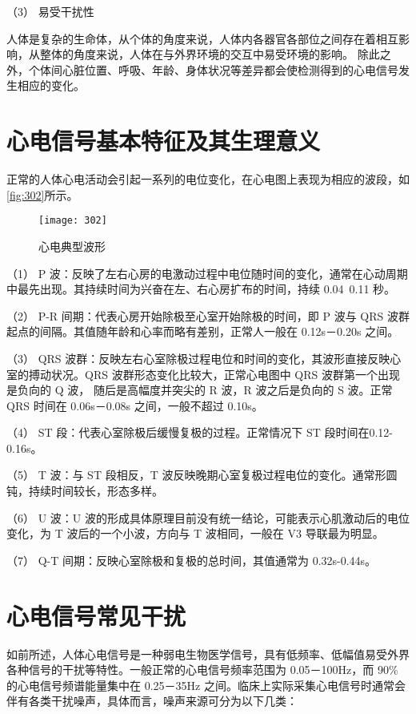 （3）	易受干扰性 

人体是复杂的生命体，从个体的角度来说，人体内各器官各部位之间存在着相互影响，从整体的角度来说，人体在与外界环境的交互中易受环境的影响。
除此之外，个体间心脏位置、呼吸、年龄、身体状况等差异都会使检测得到的心电信号发生相应的变化。 

\section{心电信号基本特征及其生理意义}
正常的人体心电活动会引起一系列的电位变化，在心电图上表现为相应的波段，如\autoref{fig:302}所示\cite{9}。 
\begin{figure}[htbp]
    \centering
    \texttt{[image: 302]}
    \caption{\label{fig:302}心电典型波形}
\end{figure}

（1）	P 波：反映了左右心房的电激动过程中电位随时间的变化，通常在心动周期中最先出现。其持续时间为兴奋在左、右心房扩布的时间，持续 0.04~0.11 秒。 

（2）	P-R 间期：代表心房开始除极至心室开始除极的时间，即 P 波与 QRS 波群起点的间隔。其值随年龄和心率而略有差别，正常人一般在 0.12s－0.20s 之间。 

（3）	QRS 波群：反映左右心室除极过程电位和时间的变化，其波形直接反映心室的搏动状况。QRS 波群形态变化比较大，正常心电图中 QRS 波群第一个出现是负向的 Q 波，
随后是高幅度并突尖的 R 波，R 波之后是负向的 S 波。正常 QRS 时间在 0.06s－0.08s 之间，一般不超过 0.10s。 

（4）	ST 段：代表心室除极后缓慢复极的过程。正常情况下 ST 段时间在0.12-0.16s。 

（5）	T 波：与 ST 段相反，T 波反映晚期心室复极过程电位的变化。通常形圆钝，持续时间较长，形态多样。 

（6）	U 波：U 波的形成具体原理目前没有统一结论，可能表示心肌激动后的电位变化，为 T 波后的一个小波，方向与 T 波相同，一般在 V3 导联最为明显。 

（7）	Q-T 间期：反映心室除极和复极的总时间，其值通常为 0.32s-0.44s。 

\section{心电信号常见干扰}

如前所述，人体心电信号是一种弱电生物医学信号，具有低频率、低幅值易受外界各种信号的干扰等特性。一般正常的心电信号频率范围为 0.05－100Hz，而 90\%
的心电信号频谱能量集中在 0.25－35Hz 之间。临床上实际采集心电信号时通常会伴有各类干扰噪声，具体而言，噪声来源可分为以下几类： 

